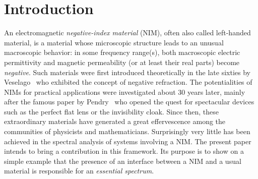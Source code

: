 \section{Introduction}\label{s-intro}
An electromagnetic \emph{negative-index material} (NIM), often also called left-handed material, is a material whose microscopic structure leads to an unusual macroscopic behavior: in some frequency range(s), both macroscopic electric permittivity and magnetic permeability (or at least their real parts) become \emph{negative}. Such materials were first introduced theoretically in the late sixties by Veselago~\cite{Ves-68} who exhibited the concept of negative refraction. The potentialities of NIMs for practical applications were investigated about 30 years later, mainly after the famous paper by Pendry~\cite{Pen-00} who opened the quest for spectacular devices such as the perfect flat lens or the invisibility cloak. Since then, these extraordinary materials have generated a great effervescence among the communities of physicists and mathematicians. Surprisingly very little has been achieved in the spectral analysis of systems involving a NIM. The present paper intends to bring a contribution in this framework. Its purpose is to show on a simple example that the presence of an interface between a NIM and a usual material is responsible for an \emph{essential spectrum}.


